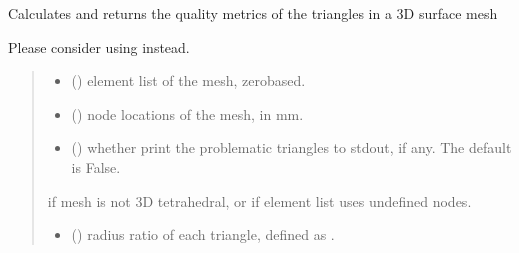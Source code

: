 \documentclass[letterpaper,10pt,english]{sphinxmanual}
\begin{document}
\begin{fulllineitems}
\label{\detokenize{_autosummary/nirfasterff.meshing.meshutils.checkmesh3d_surface:nirfasterff.meshing.meshutils.checkmesh3d_surface}}
\pysigstartsignatures
\pysiglinewithargsret
{}
{\sphinxparamcomma {}\sphinxparamcomma {}}
{}
\pysigstopsignatures
\sphinxAtStartPar
Calculates and returns the quality metrics of the triangles in a 3D surface mesh

\sphinxAtStartPar
Please consider using  instead.
\begin{quote}\begin{description}
\begin{itemize}
\item {} 
\sphinxAtStartPar
{} () \textendash{} element list of the mesh, zero\sphinxhyphen{}based.

\item {} 
\sphinxAtStartPar
{} () \textendash{} node locations of the mesh, in mm.

\item {} 
\sphinxAtStartPar
{} (\sphinxstyleliteralemphasis{\sphinxupquote{, }}) \textendash{} whether print the problematic triangles to stdout, if any. The default is False.

\end{itemize}

\sphinxAtStartPar
{} \textendash{} if mesh is not 3D tetrahedral, or if element list uses undefined nodes.

\sphinxAtStartPar
\begin{itemize}
\item {} 
\sphinxAtStartPar
{} () \textendash{} radius ratio of each triangle, defined as .


\end{itemize}
\end{description}
\end{quote}
\end{fulllineitems}
\end{document}
